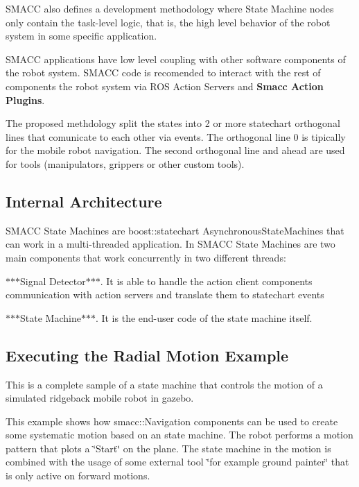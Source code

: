 S\+M\+A\+CC also defines a development methodology where State Machine nodes only contain the task-\/level logic, that is, the high level behavior of the robot system in some specific application.

S\+M\+A\+CC applications have low level coupling with other software components of the robot system. S\+M\+A\+CC code is recomended to interact with the rest of components the robot system via R\+OS Action Servers and {\bfseries Smacc Action Plugins}.

The proposed methdology split the states into 2 or more statechart orthogonal lines that comunicate to each other via events. The orthogonal line 0 is tipically for the mobile robot navigation. The second orthogonal line and ahead are used for tools (manipulators, grippers or other custom tools).

 

\subsection*{Internal Architecture}

S\+M\+A\+CC State Machines are boost\+::statechart Asynchronous\+State\+Machines that can work in a multi-\/threaded application. In S\+M\+A\+CC State Machines are two main components that work concurrently in two different threads\+:


\begin{DoxyItemize}
\item $\ast$$\ast$$\ast$\+Signal Detector$\ast$$\ast$$\ast$. It is able to handle the action client components communication with action servers and translate them to statechart events
\item $\ast$$\ast$$\ast$\+State Machine$\ast$$\ast$$\ast$. It is the end-\/user code of the state machine itself.
\end{DoxyItemize}

 

\subsection*{Executing the Radial Motion Example}

This is a complete sample of a state machine that controls the motion of a simulated ridgeback mobile robot in gazebo.

This example shows how smacc\+::\+Navigation components can be used to create some systematic motion based on an state machine. The robot performs a motion pattern that plots a \char`\"{}\+Start\char`\"{} on the plane. The state machine in the motion is combined with the usage of some external tool \char`\"{}for example ground painter\char`\"{} that is only active on forward motions.


